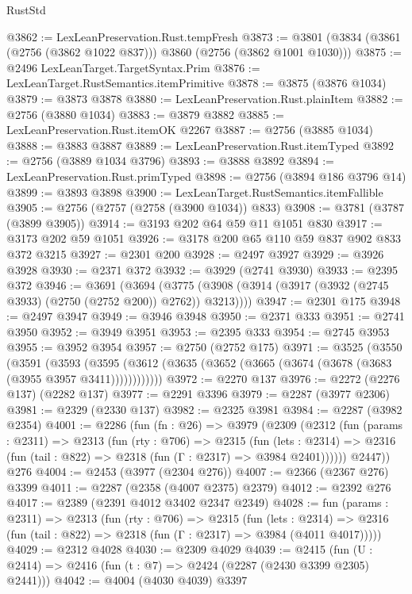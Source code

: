 \begin{lexlean}{RustStd}
\begin{coremodule}
@3862 := LexLeanPreservation.Rust.tempFresh
@3873 := @3801 (@3834 (@3861 (@2756 (@3862 @1022 @837))) @3860 (@2756 (@3862 @1001 @1030)))
@3875 := @2496 LexLeanTarget.TargetSyntax.Prim
@3876 := LexLeanTarget.RustSemantics.itemPrimitive
@3878 := @3875 (@3876 @1034)
@3879 := @3873 @3878
@3880 := LexLeanPreservation.Rust.plainItem
@3882 := @2756 (@3880 @1034)
@3883 := @3879 @3882
@3885 := LexLeanPreservation.Rust.itemOK @2267
@3887 := @2756 (@3885 @1034)
@3888 := @3883 @3887
@3889 := LexLeanPreservation.Rust.itemTyped
@3892 := @2756 (@3889 @1034 @3796)
@3893 := @3888 @3892
@3894 := LexLeanPreservation.Rust.primTyped
@3898 := @2756 (@3894 @186 @3796 @14)
@3899 := @3893 @3898
@3900 := LexLeanTarget.RustSemantics.itemFallible
@3905 := @2756 (@2757 (@2758 (@3900 @1034)) @833)
@3908 := @3781 (@3787 (@3899 @3905))
@3914 := @3193 @202 @64 @59 @11 @1051 @830
@3917 := @3173 @202 @59 @1051
@3926 := @3178 @200 @65 @110 @59 @837 @902 @833 @372 @3215
@3927 := @2301 @200
@3928 := @2497 @3927
@3929 := @3926 @3928
@3930 := @2371 @372
@3932 := @3929 (@2741 @3930)
@3933 := @2395 @372
@3946 := @3691
    (@3694 (@3775 (@3908 (@3914 (@3917 (@3932 (@2745 @3933) (@2750 (@2752 @200)) @2762)) @3213))))
@3947 := @2301 @175
@3948 := @2497 @3947
@3949 := @3946 @3948
@3950 := @2371 @333
@3951 := @2741 @3950
@3952 := @3949 @3951
@3953 := @2395 @333
@3954 := @2745 @3953
@3955 := @3952 @3954
@3957 := @2750 (@2752 @175)
@3971 := @3525
    (@3550
      (@3591
        (@3593
          (@3595 (@3612 (@3635 (@3652 (@3665 (@3674 (@3678 (@3683 (@3955 @3957 @3411))))))))))))
@3972 := @2270 @137
@3976 := @2272 (@2276 @137) (@2282 @137)
@3977 := @2291 @3396
@3979 := @2287 (@3977 @2306)
@3981 := @2329 (@2330 @137)
@3982 := @2325 @3981
@3984 := @2287 (@3982 @2354)
@4001 := @2286
    (fun (fn : @26) =>
    @3979
      (@2309
        (@2312
          (fun (params : @2311) =>
          @2313
            (fun (rty : @706) =>
            @2315
              (fun (lets : @2314) =>
              @2316 (fun (tail : @822) => @2318 (fun (Γ : @2317) => @3984 @2401))))))
        @2447))
    @276
@4004 := @2453 (@3977 (@2304 @276))
@4007 := @2366 (@2367 @276) @3399
@4011 := @2287 (@2358 (@4007 @2375) @2379)
@4012 := @2392 @276
@4017 := @2389 (@2391 @4012 @3402 @2347 @2349)
@4028 := fun (params : @2311) =>
  @2313
    (fun (rty : @706) =>
    @2315
      (fun (lets : @2314) =>
      @2316 (fun (tail : @822) => @2318 (fun (Γ : @2317) => @3984 (@4011 @4017)))))
@4029 := @2312 @4028
@4030 := @2309 @4029
@4039 := @2415 (fun (U : @2414) => @2416 (fun (t : @7) => @2424 (@2287 (@2430 @3399 @2305) @2441)))
@4042 := @4004 (@4030 @4039) @3397

\end{coremodule}
\end{lexlean}
